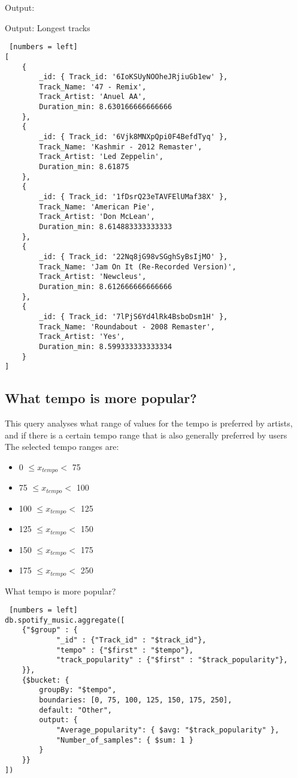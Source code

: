 \documentclass{Configuration_Files/PoliMi3i_thesis}
\begin{document}
Output:
\begin{algorithm}[h!]
\caption{Output: Longest tracks}
\begin{lstlisting} [numbers = left]
[
	{
		_id: { Track_id: '6IoKSUyNOOheJRjiuGb1ew' },
		Track_Name: '47 - Remix',
		Track_Artist: 'Anuel AA',
		Duration_min: 8.630166666666666
	},
	{
		_id: { Track_id: '6Vjk8MNXpQpi0F4BefdTyq' },
		Track_Name: 'Kashmir - 2012 Remaster',
		Track_Artist: 'Led Zeppelin',
		Duration_min: 8.61875
	},
	{
		_id: { Track_id: '1fDsrQ23eTAVFElUMaf38X' },
		Track_Name: 'American Pie',
		Track_Artist: 'Don McLean',
		Duration_min: 8.614883333333333
	},
	{
		_id: { Track_id: '22Nq8jG98vSGghSyBsIjMO' },
		Track_Name: 'Jam On It (Re-Recorded Version)',
		Track_Artist: 'Newcleus',
		Duration_min: 8.612666666666666
	},
	{
		_id: { Track_id: '7lPjS6Yd4lRk4BsboDsm1H' },
		Track_Name: 'Roundabout - 2008 Remaster',
		Track_Artist: 'Yes',
		Duration_min: 8.599333333333334
	}
]
\end{lstlisting}
\end{algorithm}
\newpage

\subsection{What tempo is more popular?}
This query analyses what range of values for the tempo is preferred by artists, and if there is a certain tempo range that is also generally preferred by users\\
The selected tempo ranges are:
\begin{itemize}
	\item 0 $\le x_{tempo} <$ 75
	\item 75 $\le x_{tempo} <$ 100
	\item 100 $\le x_{tempo} <$ 125
	\item 125 $\le x_{tempo} <$ 150
	\item 150 $\le x_{tempo} <$ 175
	\item 175 $\le x_{tempo} <$ 250
\end{itemize}

\begin{algorithm}[ht]
\caption{What tempo is more popular?}
\begin{lstlisting} [numbers = left]
db.spotify_music.aggregate([
	{"$group" : {
			"_id" : {"Track_id" : "$track_id"},
			"tempo" : {"$first" : "$tempo"},
			"track_popularity" : {"$first" : "$track_popularity"},
	}},
	{$bucket: {
		groupBy: "$tempo",
		boundaries: [0, 75, 100, 125, 150, 175, 250],
		default: "Other",
		output: {
			"Average_popularity": { $avg: "$track_popularity" },
			"Number_of_samples": { $sum: 1 }
		}
	}}
])
\end{lstlisting}
\end{algorithm}
\newpage
\end{document}
